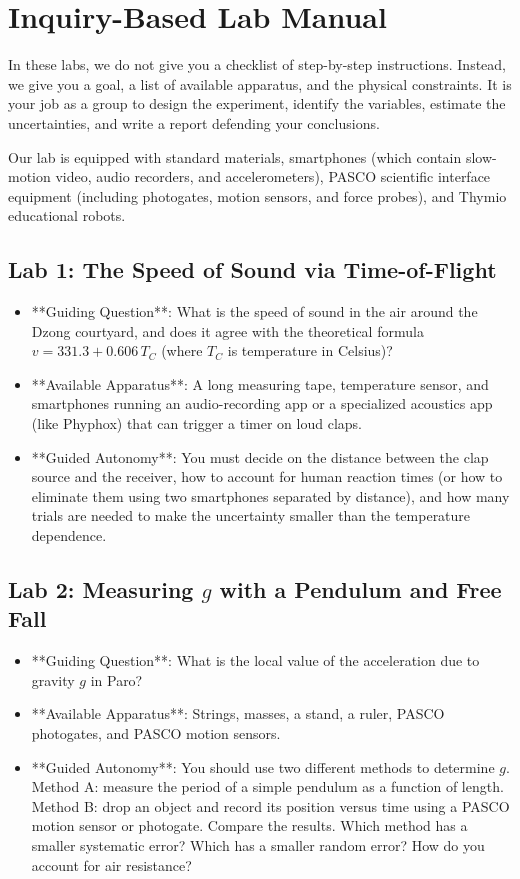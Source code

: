 \section{Inquiry-Based Lab Manual}

In these labs, we do not give you a checklist of step-by-step instructions. Instead, we give you a goal, a list of available apparatus, and the physical constraints. It is your job as a group to design the experiment, identify the variables, estimate the uncertainties, and write a report defending your conclusions.

Our lab is equipped with standard materials, smartphones (which contain slow-motion video, audio recorders, and accelerometers), PASCO scientific interface equipment (including photogates, motion sensors, and force probes), and Thymio educational robots.

\subsection{Lab 1: The Speed of Sound via Time-of-Flight}
\begin{itemize}
  \item **Guiding Question**: What is the speed of sound in the air around the Dzong courtyard, and does it agree with the theoretical formula $v = 331.3 + 0.606\,T_C$ (where $T_C$ is temperature in Celsius)?
  \item **Available Apparatus**: A long measuring tape, temperature sensor, and smartphones running an audio-recording app or a specialized acoustics app (like Phyphox) that can trigger a timer on loud claps.
  \item **Guided Autonomy**: You must decide on the distance between the clap source and the receiver, how to account for human reaction times (or how to eliminate them using two smartphones separated by distance), and how many trials are needed to make the uncertainty smaller than the temperature dependence.
\end{itemize}

\subsection{Lab 2: Measuring $g$ with a Pendulum and Free Fall}
\begin{itemize}
  \item **Guiding Question**: What is the local value of the acceleration due to gravity $g$ in Paro?
  \item **Available Apparatus**: Strings, masses, a stand, a ruler, PASCO photogates, and PASCO motion sensors.
  \item **Guided Autonomy**: You should use two different methods to determine $g$. Method A: measure the period of a simple pendulum as a function of length. Method B: drop an object and record its position versus time using a PASCO motion sensor or photogate. Compare the results. Which method has a smaller systematic error? Which has a smaller random error? How do you account for air resistance?
\end{itemize}

